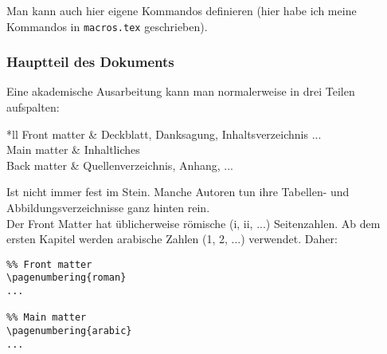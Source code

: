 Man kann auch hier eigene Kommandos definieren
(hier habe ich meine Kommandos in \texttt{macros.tex} geschrieben).


\subsubsection{Hauptteil des Dokuments}
Eine akademische Ausarbeitung kann man normalerweise in drei Teilen
aufspalten:
\begin{center}
	\begin{tabu} to \textwidth{*ll}
	Front matter & Deckblatt, Danksagung, Inhaltsverzeichnis ...\\
	Main matter  & Inhaltliches\\
	Back matter  & Quellenverzeichnis, Anhang, ...
	\end{tabu}
\end{center}

Ist nicht immer fest im Stein. Manche Autoren tun ihre 
Tabellen- und Abbildungsverzeichnisse ganz hinten rein.\\

Der Front Matter hat üblicherweise römische (i, ii, ...) Seitenzahlen.
Ab dem ersten Kapitel werden arabische Zahlen (1, 2, ...)
verwendet. Daher:
\begin{verbatim}
%% Front matter
\pagenumbering{roman}
...

%% Main matter
\pagenumbering{arabic}
...
\end{verbatim}